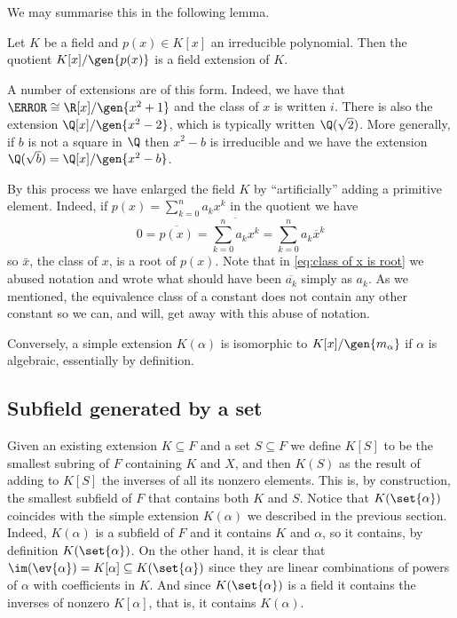\documentclass[12pt,oneside]{book}
\begin{document}
We may summarise this in the following lemma.
\begin{lemma}
	Let \( K \) be a field and \( p(x) \in K[x] \) an irreducible polynomial. Then the
	quotient \( K[x]/\gen{p(x)}  \) is a field extension of \( K \).
\end{lemma}

A number of extensions are of this form. Indeed, we have that \( \C \cong \R[x]/\gen{x^2 +
1} \) and the class of \( x \) is written \( i \). There is also the extension \(
\Q[x]/\gen{x^2 - 2} \), which is typically written \( \Q(\sqrt{2}) \). More generally, if
\( b \) is not a square in \( \Q \) then \( x^2 - b \) is irreducible and we have the
extension \( \Q(\sqrt{b}) = \Q[x]/\gen{x^2 - b} \).

By this process we have enlarged the field \( K \) by ``artificially'' adding a primitive
element. Indeed, if \( p(x) = \sum_{k = 0}^{n}a_k x^k  \) in the quotient we
have
\begin{equation}\label{eq:class of x is root}
	0 = \overline{p(x)} = \overline{\sum_{k = 0}^{n}a_k x^k } = \sum_{k = 0}^{n} a_k
	\overline{x}^k 
\end{equation}
so \( \bar{x} \), the class of \( x \), is a root of \( p(x) \). Note that in
\cref{eq:class of x is root} we abused notation and wrote what should have been \(
\overline{a_k} \) simply as \( a_k \). As we mentioned, the equivalence class of a
constant does not contain any other constant so we can, and will, get away with this abuse of
notation.

Conversely, a simple extension \( K(\alpha) \) is isomorphic to \(
K[x]/\gen{m_{\alpha}} \) if \( \alpha \) is algebraic, essentially by definition.

\subsection{Subfield generated by a set}
Given an existing extension \( K \subseteq F \) and a set \( S \subseteq F \) we define \(
K[S] \) to be the smallest subring of \( F \) containing \( K \) and \( X \), and then \(
K(S) \) as the result of adding to \( K[S] \) the inverses of all its nonzero elements.
This is, by construction, the smallest subfield of \( F \) that contains both \( K \) and
\( S \). Notice that \( K(\set{\alpha}) \) coincides with the simple extension \( K(\alpha) \) we
described in the previous section. Indeed, \( K(\alpha) \) is a subfield of \( F \) and
it contains \( K \) and \( \alpha \), so it contains, by definition \( K(\set{\alpha}) \).
On the other hand, it is clear that \( \im(\ev{\alpha}) = K[\alpha] \subseteq
K(\set{\alpha}) \) since they are linear combinations of powers of \( \alpha \) with
coefficients in \( K \). And since \( K(\set{\alpha}) \) is a field it contains the
inverses of nonzero \( K[\alpha] \), that is, it contains \( K(\alpha) \).
\end{document}
